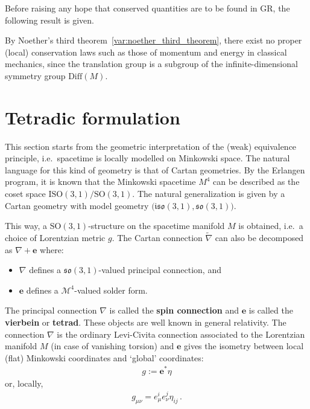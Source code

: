     Before raising any hope that conserved quantities are to be found in GR, the following result is given.
    \begin{property}
        By Noether's third theorem~\ref{var:noether_third_theorem}, there exist no proper (local) conservation laws such as those of momentum and energy in classical mechanics, since the translation group is a subgroup of the infinite-dimensional symmetry group $\mathrm{Diff}(M)$.
    \end{property}

\section{Tetradic formulation}

    This section starts from the geometric interpretation of the (weak) equivalence principle, i.e.~spacetime is locally modelled on Minkowski space. The natural language for this kind of geometry is that of Cartan geometries. By the Erlangen program, it is known that the Minkowski spacetime $M^4$ can be described as the coset space $\mathrm{ISO}(3,1)/\mathrm{SO}(3,1)$. The natural generalization is given by a Cartan geometry with model geometry $\bigl(\mathfrak{iso}(3,1),\mathfrak{so}(3,1)\bigr)$.

    \begin{property}
        This way, a $\mathrm{SO}(3,1)$-structure on the spacetime manifold $M$ is obtained, i.e.~a choice of Lorentzian metric $g$. The Cartan connection $\widetilde{\nabla}$ can also be decomposed as $\nabla+\mathbf{e}$ where:
        \begin{itemize}
            \item $\nabla$ defines a $\mathfrak{so}(3,1)$-valued principal connection, and
            \item $\mathbf{e}$ defines a $\mathcal{M}^4$-valued solder form.
        \end{itemize}
        The principal connection $\nabla$ is called the \textbf{spin connection} and $\mathbf{e}$ is called the \textbf{vierbein} or \textbf{tetrad}. These objects are well known in general relativity. The connection $\nabla$ is the ordinary Levi-Civita connection associated to the Lorentzian manifold $M$ (in case of vanishing torsion) and $\mathbf{e}$ gives the isometry between local (flat) Minkowski coordinates and `global' coordinates:
        \begin{gather}
            g := \mathbf{e}^*\eta
        \end{gather}
        or, locally,
        \begin{gather}
            g_{\mu\nu} = e^i_\mu e^j_\nu\eta_{ij}\,.
        \end{gather}
    \end{property}

